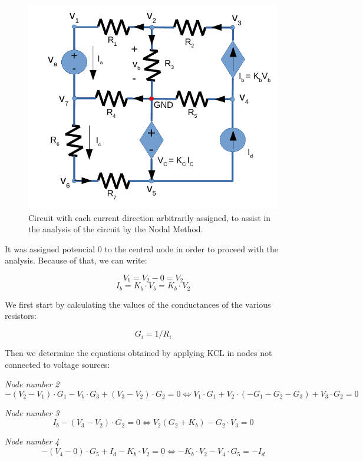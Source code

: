 \begin{figure}[H] \centering
\includegraphics[width=0.4\linewidth]{nvoltages.pdf}
\caption{Circuit with each current direction arbitrarily assigned, to assist in the analysis of the circuit by the Nodal Method.}
\label{fig:nvoltages}
\end{figure}

It was assigned potencial 0 to the central node in order to proceed with the analysis. Because of that, we can write:

\begin{equation}
  V_b=V_2 - 0 = V_2
\end{equation}
\begin{equation}
  I_b= K_b \cdot V_b= K_b \cdot V_2
\end{equation}

We first start by calculating the values of the conductances of the various resistors:

\begin{equation}
  G_i=1/R_i
\end{equation}

Then we determine the equations obtained by applying KCL in nodes not connected to voltage sources:

\textit{Node number 2}
\begin{equation}
  -(V_2 -V_1)\cdot G_1 -V_b \cdot G_3 + (V_3-V_2)\cdot G_2 =0 
  \Leftrightarrow V_1\cdot G_1+V_2 \cdot (-G_1-G_2-G_3) + V_3\cdot G_2 =0
  \label{eq:kcl2}
\end{equation}

\textit{Node number 3}
\begin{equation}
  I_b - (V_3-V_2) \cdot G_2=0 \Leftrightarrow V_2(G_2 + K_b) - G_2 \cdot V_3 =0
  \label{eq:kcl3}
\end{equation}

\textit{Node number 4}
\begin{equation}
  -(V_4-0) \cdot G_5+I_d-K_b\cdot V_2=0 \Leftrightarrow -K_b\cdot V_2-V_4 \cdot G_5 = -I_d
  \label{eq:kcl4}
\end{equation}

